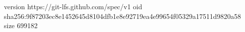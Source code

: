version https://git-lfs.github.com/spec/v1
oid sha256:9f87203ec8e1452645d8104dfb1e8e92719ea4e99654f05329a17511d9820a58
size 699182
